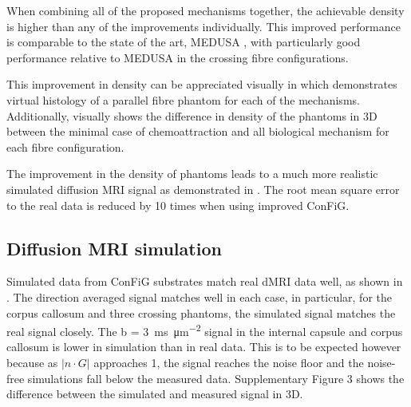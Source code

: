 When combining all of the proposed mechanisms together, the achievable density is higher than any of the improvements individually. This improved performance is comparable to the state of the art, MEDUSA \cite{Ginsburger2019}, with particularly good performance relative to MEDUSA in the crossing fibre configurations.

This improvement in density can be appreciated visually in  which demonstrates virtual histology of a parallel fibre phantom for each of the mechanisms. Additionally,  visually shows the difference in density of the phantoms in 3D between the minimal case of chemoattraction and all biological mechanism for each fibre configuration.

The improvement in the density of phantoms leads to a much more realistic simulated diffusion MRI signal as demonstrated in . The root mean square error to the real data is reduced by 10 times when using improved ConFiG.


\subsection{Diffusion MRI simulation}
\label{sec:config_result_dmri_sim}
Simulated data from ConFiG substrates match real dMRI data well, as shown in . The direction averaged signal matches well in each case, in particular, for the corpus callosum and three crossing phantoms, the simulated signal matches the real signal closely. The b = \SI{3}{\milli\second\per\micro\metre\squared} signal in the internal capsule and corpus callosum is lower in simulation than in real data. This is to be expected however because as $|n\cdot G|$ approaches 1, the signal reaches the noise floor and the noise-free simulations fall below the measured data. Supplementary Figure 3 shows the difference between the simulated and measured signal in 3D.

